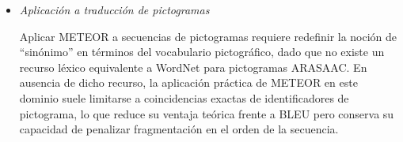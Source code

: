 \begin{itemize}
La dependencia de recursos léxicos externos (como WordNet) limita su aplicabilidad directa a idiomas o dominios donde dichos recursos son escasos o inexistentes; además, los parámetros $\alpha$, $\gamma$ y $\beta$ requieren calibración específica por idioma para un desempeño óptimo.

\item \textit{Aplicación a traducción de pictogramas} \\
\vspace{-0.5cm}

Aplicar METEOR a secuencias de pictogramas requiere redefinir la noción de ``sinónimo'' en términos del vocabulario pictográfico, dado que no existe un recurso léxico equivalente a WordNet para pictogramas ARASAAC. En ausencia de dicho recurso, la aplicación práctica de METEOR en este dominio suele limitarse a coincidencias exactas de identificadores de pictograma, lo que reduce su ventaja teórica frente a BLEU pero conserva su capacidad de penalizar fragmentación en el orden de la secuencia.
\end{itemize}

